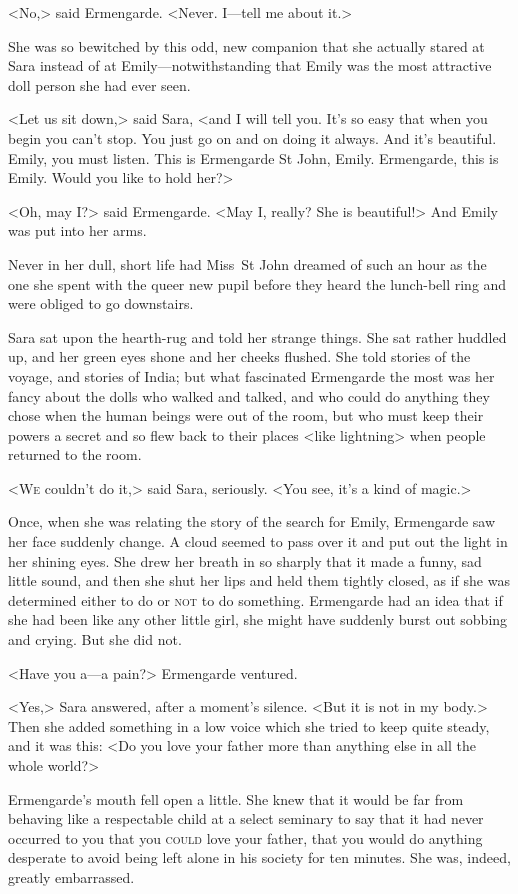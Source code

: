 <No,> said Ermengarde. <Never. I—tell me about it.>

She was so bewitched by this odd, new companion that she actually stared at Sara instead of at Emily—notwithstanding that Emily was the most attractive doll person she had ever seen.

<Let us sit down,> said Sara, <and I will tell you. It's so easy that when you begin you can't stop. You just go on and on doing it always. And it's beautiful. Emily, you must listen. This is Ermengarde St John, Emily. Ermengarde, this is Emily. Would you like to hold her?>

<Oh, may I\@?> said Ermengarde. <May I, really? She is beautiful!> And Emily was put into her arms.

Never in her dull, short life had Miss~St John dreamed of such an hour as the one she spent with the queer new pupil before they heard the lunch-bell ring and were obliged to go downstairs.

Sara sat upon the hearth-rug and told her strange things. She sat rather huddled up, and her green eyes shone and her cheeks flushed. She told stories of the voyage, and stories of India; but what fascinated Ermengarde the most was her fancy about the dolls who walked and talked, and who could do anything they chose when the human beings were out of the room, but who must keep their powers a secret and so flew back to their places <like lightning> when people returned to the room.

<\textsc{We} couldn't do it,> said Sara, seriously. <You see, it's a kind of magic.>

Once, when she was relating the story of the search for Emily, Ermengarde saw her face suddenly change. A cloud seemed to pass over it and put out the light in her shining eyes. She drew her breath in so sharply that it made a funny, sad little sound, and then she shut her lips and held them tightly closed, as if she was determined either to do or \textsc{not} to do something. Ermengarde had an idea that if she had been like any other little girl, she might have suddenly burst out sobbing and crying. But she did not.

<Have you a—a pain?> Ermengarde ventured.

<Yes,> Sara answered, after a moment's silence. <But it is not in my body.> Then she added something in a low voice which she tried to keep quite steady, and it was this: <Do you love your father more than anything else in all the whole world?>

Ermengarde's mouth fell open a little. She knew that it would be far from behaving like a respectable child at a select seminary to say that it had never occurred to you that you \textsc{could} love your father, that you would do anything desperate to avoid being left alone in his society for ten minutes. She was, indeed, greatly embarrassed.

